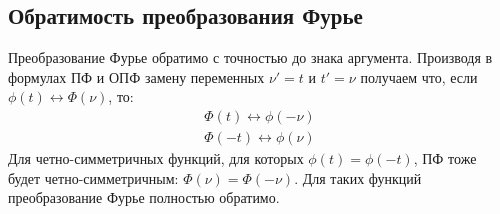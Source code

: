 \documentclass[a4paper, 12pt]{report}
\begin{document}
	\subsection{Обратимость преобразования Фурье}
	Преобразование Фурье обратимо с точностью до знака аргумента. Производя в формулах ПФ и ОПФ замену переменных $\nu' = t$  и $t' = \nu$ получаем что, если $\phi(t) \leftrightarrow \Phi(\nu)$, то:
	\[
        		\begin{aligned}
            		\Phi(t) \leftrightarrow \phi(-\nu) \\
			\Phi(-t) \leftrightarrow \phi(\nu)
        		\end{aligned}
    	\]
	Для четно-симметричных функций, для которых $\phi(t) = \phi(-t)$, ПФ тоже будет четно-симметричным: $\Phi(\nu) = \Phi(-\nu)$. Для таких функций преобразование Фурье полностью обратимо.
	
\end{document}
